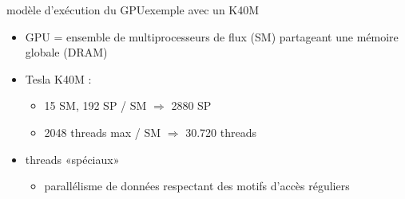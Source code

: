 \documentclass[11pt,mathserif]{beamer}
\begin{document}
\begin{frame}{modèle d'exécution du GPU}{exemple avec un K40M}
\begin{minipage}[c]{0.59\linewidth}
  \begin{itemize}[<+->]
    \item GPU = ensemble de multiprocesseurs de flux (SM) partageant une mémoire globale (DRAM)
    \item Tesla K40M : 
      \begin{itemize}
        \item 15 SM, 192 SP / SM $\Rightarrow$ 2880 SP
        \item 2048 threads max / SM $\Rightarrow$ 30.720 threads
      \end{itemize}
    \item threads «spéciaux»
      \begin{itemize}
        \item parallélisme de données respectant des motifs d'accès réguliers
      \end{itemize}
  \end{itemize}
\end{minipage}
\begin{minipage}[c]{0.39\linewidth}
\begin{center}
\end{center}
\end{minipage}
\end{frame}
\end{document}
